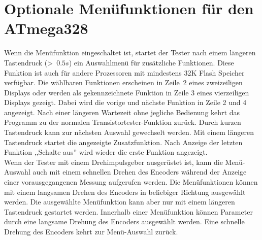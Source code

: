 \section{Optionale Menüfunktionen für den ATmega328}
Wenn die Menüfunktion eingeschaltet ist, startet der Tester nach einem längeren Tastendruck (\textgreater~\(0.5s\)) ein Auswahlmenü
für zusätzliche Funktionen.
Diese Funktion ist auch für andere Prozessoren mit mindestens 32K Flash Speicher verfügbar.
Die wählbaren Funktionen erscheinen in Zeile~2 eines zweizeiligen Displays oder werden als gekennzeichnete
Funktion in Zeile 3 eines vierzeiligen Displays gezeigt. Dabei wird die vorige und nächste Funktion in Zeile 2 und 4 angezeigt.
Nach einer längeren Wartezeit ohne jegliche Bedienung kehrt das Programm zu der normalen Transistortester-Funktion zurück.
Durch kurzen Tastendruck kann zur nächsten Auswahl gewechselt werden.
Mit einem längeren Tastendruck startet die angezeigte Zusatzfunktion.
Nach Anzeige der letzten Funktion ,,Schalte aus'' wird wieder die erste Funktion angezeigt.\\

Wenn der Tester mit einem Drehimpulsgeber ausgerüstet ist, kann die Menü-Auswahl auch mit einem schnellen
Drehen des Encoders während der Anzeige einer vorausgegangenen Messung aufgerufen werden.
Die Menüfunktionen können mit einem langsamen Drehen des Encoders in beliebiger Richtung ausgewählt werden.
Die ausgewählte Menüfunktion kann aber nur mit einem längeren Tastendruck gestartet werden.
Innerhalb einer Menüfunktion können Parameter durch eine langsame Drehung des Encoders ausgewählt werden.
Eine schnelle Drehung des Encoders kehrt zur Menü-Auswahl zurück.

